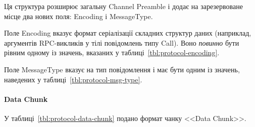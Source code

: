 Ця структура розширює загальну Channel Preamble і додає на зарезервоване
місце два нових поля: Encoding і MessageType.

Поле Encoding вказує формат серіалізації складних структур даних (наприклад,
аргументів \gls{RPC}-викликів у тілі повідомлень типу Call). Воно
\emph{повинно} бути рівним одному із значень, вказаних у
таблиці~\ref{tbl:protocol-encoding}.

Поле MessageType вказує на тип повідомлення і має бути одним із значень,
наведених у таблиці~\ref{tbl:protocol-msg-type}.

\begin{table}[htbp]
\end{table}

\begin{table}[htbp]
\end{table}

\paragraph{Data Chunk}

У таблиці~\ref{tbl:protocol-data-chunk} подано формат чанку <<Data Chunk>>.

\begin{table}[htbp]
\end{table}

